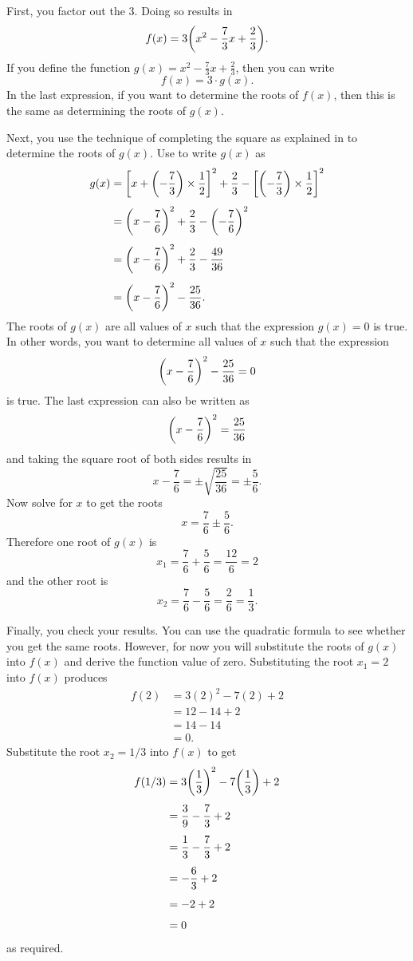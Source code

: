 \documentclass[a4paper,oneside,12pt]{article}
\begin{document}
\begin{solution}
First, you factor out the $3$.  Doing so results in
\[
f(x)
=
3
\parenthesis*{
  x^2 - \frac{7}{3}x + \frac{2}{3}
}.
\]
If you define the function $g(x) = x^2 - \frac{7}{3}x + \frac{2}{3}$,
then you can write
\[
f(x)
=
3 \cdot g(x).
\]
In the last expression, if you want to determine the roots of $f(x)$,
then this is the same as determining the roots of $g(x)$.

Next, you use the technique of completing the square as explained in
 to determine the roots
of $g(x)$.  Use  to write
$g(x)$ as
\begin{align*}
g(x)
&=
\squarebracket*{
  x
  +
  \parenthesis*{-\frac{7}{3}} \times \frac{1}{2}
}^2
+
\frac{2}{3}
-
\squarebracket*{
  \parenthesis*{-\frac{7}{3}} \times \frac{1}{2}
}^2 \\[4pt]
&=
\parenthesis*{
  x
  -
  \frac{7}{6}
}^2
+
\frac{2}{3}
-
\parenthesis*{-\frac{7}{6}}^2 \\[4pt]
&=
\parenthesis*{
  x
  -
  \frac{7}{6}
}^2
+
\frac{2}{3}
-
\frac{49}{36} \\[4pt]
&=
\parenthesis*{
  x
  -
  \frac{7}{6}
}^2
-
\frac{25}{36}.
\end{align*}
The roots of $g(x)$ are all values of $x$ such that the expression
$g(x) = 0$ is true.  In other words, you want to determine all values
of $x$ such that the expression
\[
\parenthesis*{
  x
  -
  \frac{7}{6}
}^2
-
\frac{25}{36}
=
0
\]
is true.  The last expression can also be written as
\[
\parenthesis*{
  x
  -
  \frac{7}{6}
}^2
=
\frac{25}{36}
\]
and taking the square root of both sides results in
\[
x - \frac{7}{6}
=
\pm
\sqrt{\frac{25}{36}}
=
\pm
\frac{5}{6}.
\]
Now solve for $x$ to get the roots
\[
x
=
\frac{7}{6} \pm \frac{5}{6}.
\]
Therefore one root of $g(x)$ is
\[
x_1
=
\frac{7}{6} + \frac{5}{6}
=
\frac{12}{6}
=
2
\]
and the other root is
\[
x_2
=
\frac{7}{6} - \frac{5}{6}
=
\frac{2}{6}
=
\frac{1}{3}.
\]

Finally, you check your results.  You can use the quadratic formula to
see whether you get the same roots.  However, for now you will
substitute the roots of $g(x)$ into $f(x)$ and derive the function
value of zero.  Substituting the root $x_1 = 2$ into $f(x)$ produces
\begin{align*}
f(2)
&=
3(2)^2 - 7(2) + 2 \\[4pt]
&=
12 - 14 + 2 \\[4pt]
&=
14 - 14 \\[4pt]
&=
0.
\end{align*}
Substitute the root $x_2 = 1 / 3$ into $f(x)$ to get
\begin{align*}
f(1/3)
&=
3\parenthesis*{\frac{1}{3}}^2
-
7\parenthesis*{\frac{1}{3}}
+
2 \\[4pt]
&=
\frac{3}{9}
-
\frac{7}{3}
+
2 \\[4pt]
&=
\frac{1}{3}
-
\frac{7}{3}
+
2 \\[4pt]
&=
-\frac{6}{3} + 2 \\[4pt]
&=
-2 + 2 \\[4pt]
&=
0
\end{align*}
as required.
\end{solution}
\end{document}
